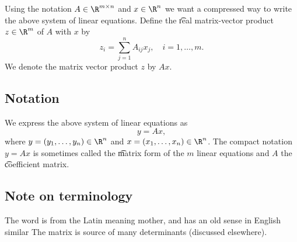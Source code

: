 Using the notation $A \in \R ^{m \times n}$ and $x \in \R ^n$ we want a compressed way to write the above system of linear equations.
Define the \t{real matrix-vector product} $z \in \R ^m$ of $A$ with $x$ by
  \[
z_{i} = \sum_{j = 1}^{n} A_{ij}x_j, \quad i = 1, \dots , m.
  \]
We denote the matrix vector product $z$ by $Ax$.

\subsection*{Notation}

We express the above system of linear equations as
  \[
y = Ax,
  \]
where $y = (y_1, \dots , y_n) \in \R ^{n}$ and $x = (x_1, \dots , x_n) \in \R ^n$.
The compact notation $y = Ax$ is sometimes called the \t{matrix form} of the $m$ linear equations and $A$ the \t{coefficient matrix}.

\subsection*{Note on terminology}

The word  is from the Latin  meaning mother, and has an old sense in English similar 
The matrix is source of many determinants (discussed elsewhere).
